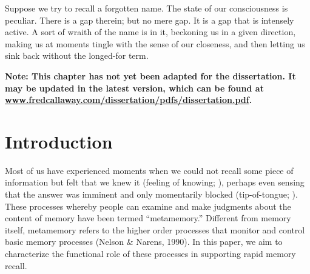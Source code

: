 \begin{savequote}[75mm]
Suppose we try to recall a forgotten name. The state of our consciousness is peculiar. There is a gap therein; but no mere gap. It is a gap that is intensely active. A sort of wraith of the name is in it, beckoning us in a given direction, making us at moments tingle with the sense of our closeness, and then letting us sink back without the longed-for term.
\end{savequote}





\label{sec:memory}

\textbf{Note: This chapter has not yet been adapted for the dissertation. It may be updated in the latest version, which can be found at \url{www.fredcallaway.com/dissertation/pdfs/dissertation.pdf}.}


\newcommand{\citepnelson}{(Nelson \& Narens, 1990)}
\newcommand{\citetnelson}{Nelson \& Narens (1990)}
\newcommand{\citealpnelson}{Nelson \& Narens, 1990}
\nocite{nelson1990metamemory}

\section{Introduction}
Most of us have experienced moments when we could not recall some piece of information but felt that we knew it (feeling of knowing; \citealp{hart1965memory}), perhaps even sensing that the answer was imminent and only momentarily blocked (tip-of-tongue; \citealp{brown1966tip}). These processes whereby people can examine and make judgments about the content of memory have been termed ``metamemory.'' Different from memory itself, metamemory refers to the higher order processes that monitor and control basic memory processes \citepnelson{}. In this paper, we aim to characterize the functional role of these processes in supporting rapid memory recall.

